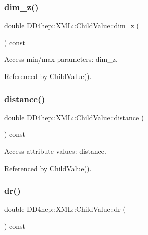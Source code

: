 \subsubsection{\texorpdfstring{dim\+\_\+z()}{dim\_z()}}
{\footnotesize\ttfamily double D\+D4hep\+::\+X\+M\+L\+::\+Child\+Value\+::dim\+\_\+z (\begin{DoxyParamCaption}{ }\end{DoxyParamCaption}) const}



Access min/max parameters\+: dim\+\_\+z. 



Referenced by Child\+Value().

\hypertarget{struct_d_d4hep_1_1_x_m_l_1_1_child_value_af031fedd108c4b35c0d606cb95993a2a}{}\label{struct_d_d4hep_1_1_x_m_l_1_1_child_value_af031fedd108c4b35c0d606cb95993a2a} 
\subsubsection{\texorpdfstring{distance()}{distance()}}
{\footnotesize\ttfamily double D\+D4hep\+::\+X\+M\+L\+::\+Child\+Value\+::distance (\begin{DoxyParamCaption}{ }\end{DoxyParamCaption}) const}



Access attribute values\+: distance. 



Referenced by Child\+Value().

\hypertarget{struct_d_d4hep_1_1_x_m_l_1_1_child_value_a8dc35d75e9080d6940ddd6de18549db8}{}\label{struct_d_d4hep_1_1_x_m_l_1_1_child_value_a8dc35d75e9080d6940ddd6de18549db8} 
\subsubsection{\texorpdfstring{dr()}{dr()}\hspace{0.1cm}{\footnotesize\ttfamily [1/2]}}
{\footnotesize\ttfamily double D\+D4hep\+::\+X\+M\+L\+::\+Child\+Value\+::dr (\begin{DoxyParamCaption}{ }\end{DoxyParamCaption}) const}



